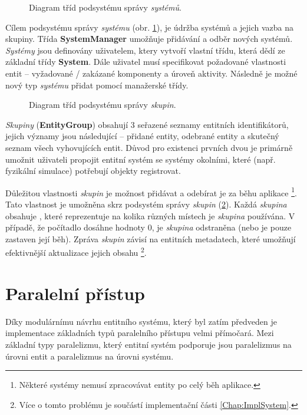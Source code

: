 \begin{figure}[H]
	\centering
	\caption{Diagram tříd podsystému správy \emph{systémů}.}
	\label{Fig:DESSystemDiagram}
\end{figure}

Cílem podsystému správy \emph{systému} (obr. \ref{Fig:DESSystemDiagram}), je údržba systémů a jejich vazba na skupiny. Třída \textbf{SystemManager} umožňuje přidávání a odběr nových systémů. \emph{Systémy} jsou definovány uživatelem, ktery vytvoří vlastní třídu, která dědí ze základní třídy \textbf{System}. Dále uživatel musí specifikovat požadované vlastnosti entit -- vyžadované / zakázané komponenty a úroveň aktivity. Následně je možné nový typ \emph{systému} přidat pomocí manažerské třídy. 

\begin{figure}[H]
	\centering
	\caption{Diagram tříd podsystému správy \emph{skupin}.}
	\label{Fig:DESGroupDiag}
\end{figure}

\emph{Skupiny} (\textbf{EntityGroup}) obsahují 3 seřazené seznamy entitních identifikátorů, jejich významy jsou následující -- přidané entity, odebrané entity a skutečný seznam všech vyhovujících entit. Důvod pro existenci prvních dvou je primárně umožnit uživateli propojit entitní systém se systémy okolními, které (např. fyzikální simulace) potřebují objekty registrovat.

Důležitou vlastnosti \emph{skupin} je možnost přidávat a odebírat je za běhu aplikace \footnote{Některé systémy nemusí zpracovávat entity po celý běh aplikace.}. Tato vlastnost je umožněna skrz podsystém správy \emph{skupin} (\ref{Fig:DESGroupDiag}). Každá \emph{skupina} obsahuje , které reprezentuje na kolika různých místech je \emph{skupina} používána. V případě, že počítadlo dosáhne hodnoty 0, je \emph{skupina} odstraněna (nebo je pouze zastaven její běh). Zpráva \emph{skupin} závisí na entitních metadatech, které umožňují efektivnější aktualizace jejich obsahu \footnote{Více o tomto problému je součástí implementační části \ref{Chap:ImplSystem}.}.

\section{Paralelní přístup}

Díky modulárnímu návrhu entitního systému, který byl zatím předveden je implementace základních typů paralelního přístupu velmi přímočará. Mezi základní typy paralelizmu, který entitní systém podporuje jsou paralelizmus na úrovni entit a paralelizmus na úrovni systému.

